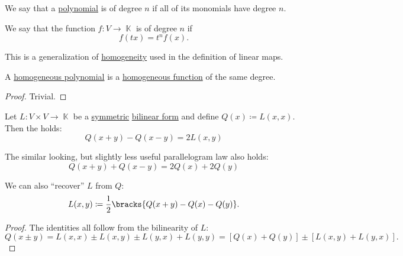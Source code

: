 \begin{definition}\label{def:homogeneous_polynomial}\mimprovised
  We say that a \hyperref[def:polynomial_algebra/polynomial]{polynomial} is  of degree \( n \) if all of its monomials have degree \( n \).
\end{definition}

\begin{definition}\label{def:homogenous_function}\mimprovised
  We say that the function \( f: V \to \BbbK \) is  of degree \( n \) if
  \begin{equation*}
    f(t x) = t^n f(x).
  \end{equation*}

  This is a generalization of \hyperref[eq:def:semimodule/homomorphism/homogeneity]{homogeneity} used in the definition of linear maps.
\end{definition}

\begin{proposition}\label{thm:homogeneous_polynomial_is_homogeneous_function}
  A \hyperref[def:homogeneous_polynomial]{homogeneous polynomial} is a \hyperref[def:homogenous_function]{homogeneous function} of the same degree.
\end{proposition}
\begin{proof}
  Trivial.
\end{proof}

\begin{proposition}\label{thm:polarization_identity}
  Let \( L: V \times V \to \BbbK \) be a \hyperref[def:symmetric_function]{symmetric} \hyperref[def:bilinear_form]{bilinear form} and define \( Q(x) \coloneqq L(x, x) \). Then the  holds:
  \begin{equation}\label{thm:polarization_identity/polarization_identity}
    Q(x + y) - Q(x - y) = 2 L(x, y)
  \end{equation}

  The similar looking, but slightly less useful parallelogram law also holds:
  \begin{equation}\label{thm:polarization_identity/parallelogram_law}
    Q(x + y) + Q(x - y) = 2 Q(x) + 2 Q(y)
  \end{equation}

  We can also \enquote{recover} \( L \) from \( Q \):
  \begin{equation}\label{thm:polarization_identity/definition}
    L(x, y) \coloneqq \frac 1 2 \bracks{ Q(x + y) - Q(x) - Q(y) }.
  \end{equation}
\end{proposition}
\begin{proof}
  The identities all follow from the bilinearity of \( L \):
  \begin{equation*}
    Q(x \pm y)
    =
    L(x, x) \pm L(x, y) \pm L(y, x) + L(y, y)
    =
    [Q(x) + Q(y)] \pm [L(x, y) + L(y, x)].
  \end{equation*}
\end{proof}

